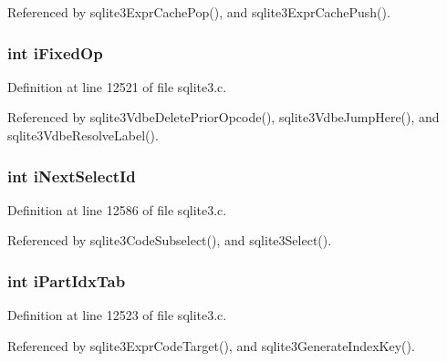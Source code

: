 Referenced by sqlite3\+Expr\+Cache\+Pop(), and sqlite3\+Expr\+Cache\+Push().

\hypertarget{struct_parse_af657414acf52d6c2f3b80cecb27a7039}{}
\subsubsection[{i\+Fixed\+Op}]{\setlength{\rightskip}{0pt plus 5cm}int i\+Fixed\+Op}\label{struct_parse_af657414acf52d6c2f3b80cecb27a7039}


Definition at line 12521 of file sqlite3.\+c.



Referenced by sqlite3\+Vdbe\+Delete\+Prior\+Opcode(), sqlite3\+Vdbe\+Jump\+Here(), and sqlite3\+Vdbe\+Resolve\+Label().

\hypertarget{struct_parse_a3be2f867adaaf8dbbd088858f4eeca69}{}
\subsubsection[{i\+Next\+Select\+Id}]{\setlength{\rightskip}{0pt plus 5cm}int i\+Next\+Select\+Id}\label{struct_parse_a3be2f867adaaf8dbbd088858f4eeca69}


Definition at line 12586 of file sqlite3.\+c.



Referenced by sqlite3\+Code\+Subselect(), and sqlite3\+Select().

\hypertarget{struct_parse_afa0328857cc33ca8154f18fdcabe1493}{}
\subsubsection[{i\+Part\+Idx\+Tab}]{\setlength{\rightskip}{0pt plus 5cm}int i\+Part\+Idx\+Tab}\label{struct_parse_afa0328857cc33ca8154f18fdcabe1493}


Definition at line 12523 of file sqlite3.\+c.



Referenced by sqlite3\+Expr\+Code\+Target(), and sqlite3\+Generate\+Index\+Key().

\hypertarget{struct_parse_a3813b936696feff0b9e68c70c22fc0ea}{}
